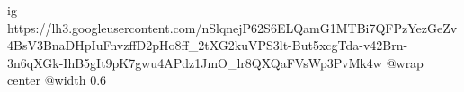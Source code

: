 
 
 
 
 

\ifcmt
  ig https://lh3.googleusercontent.com/nSlqnejP62S6ELQamG1MTBi7QFPzYezGeZv4BsV3BnaDHpIuFnvzffD2pHo8ff_2tXG2kuVPS3lt-But5xcgTda-v42Brn-3n6qXGk-IhB5gIt9pK7gwu4APdz1JmO_lr8QXQaFVsWp3PvMk4w
  @wrap center
  @width 0.6
\fi
